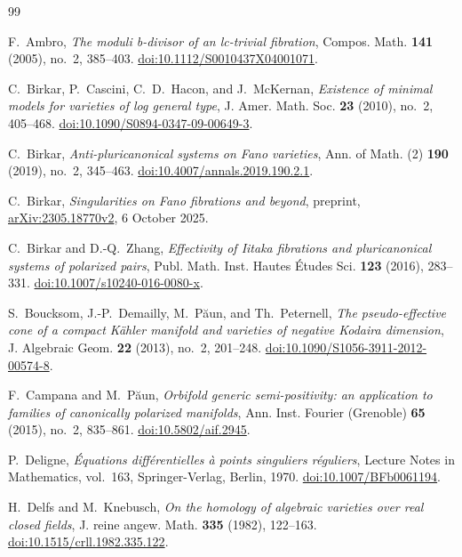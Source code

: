 \begin{thebibliography}{99}
\raggedright

F.~Ambro, \emph{The moduli b-divisor of an lc-trivial fibration},
Compos. Math. \textbf{141} (2005), no.~2, 385--403.
\href{https://doi.org/10.1112/S0010437X04001071}{doi:10.1112/S0010437X04001071}.

C.~Birkar, P.~Cascini, C.~D.~Hacon, and J.~McKernan,
\emph{Existence of minimal models for varieties of log general type},
J. Amer. Math. Soc. \textbf{23} (2010), no.~2, 405--468.
\href{https://doi.org/10.1090/S0894-0347-09-00649-3}{doi:10.1090/S0894-0347-09-00649-3}.

C.~Birkar, \emph{Anti-pluricanonical systems on Fano varieties},
Ann. of Math. (2) \textbf{190} (2019), no.~2, 345--463.
\href{https://doi.org/10.4007/annals.2019.190.2.1}{doi:10.4007/annals.2019.190.2.1}.

C.~Birkar, \emph{Singularities on Fano fibrations and beyond},
preprint, \href{https://arxiv.org/abs/2305.18770v2}{arXiv:2305.18770v2},
6 October 2025.

C.~Birkar and D.-Q.~Zhang,
\emph{Effectivity of Iitaka fibrations and pluricanonical systems of polarized pairs},
Publ. Math. Inst. Hautes \'Etudes Sci. \textbf{123} (2016), 283--331.
\href{https://doi.org/10.1007/s10240-016-0080-x}{doi:10.1007/s10240-016-0080-x}.

S.~Boucksom, J.-P.~Demailly, M.~P\u{a}un, and Th.~Peternell,
\emph{The pseudo-effective cone of a compact K\"ahler manifold and
varieties of negative Kodaira dimension},
J. Algebraic Geom. \textbf{22} (2013), no.~2, 201--248.
\href{https://doi.org/10.1090/S1056-3911-2012-00574-8}{doi:10.1090/S1056-3911-2012-00574-8}.

F.~Campana and M.~P\u{a}un,
\emph{Orbifold generic semi-positivity: an application to families of canonically polarized manifolds},
Ann. Inst. Fourier (Grenoble) \textbf{65} (2015), no.~2, 835--861.
\href{https://doi.org/10.5802/aif.2945}{doi:10.5802/aif.2945}.

P.~Deligne, \emph{\'Equations diff\'erentielles \`a points singuliers r\'eguliers},
Lecture Notes in Mathematics, vol.~163, Springer-Verlag, Berlin, 1970.
\href{https://doi.org/10.1007/BFb0061194}{doi:10.1007/BFb0061194}.

H.~Delfs and M.~Knebusch,
\emph{On the homology of algebraic varieties over real closed fields},
J. reine angew. Math. \textbf{335} (1982), 122--163.
\href{https://doi.org/10.1515/crll.1982.335.122}{doi:10.1515/crll.1982.335.122}.


\end{thebibliography}
